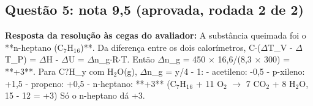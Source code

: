 \documentclass{article}%
\begin{document}
\subsection*{Questão 5: nota 9,5 (aprovada, rodada 2 de 2)}%
\textbf{Resposta da resolução às cegas do avaliador:} A substância queimada foi o **n{-}heptano (C$_{7}$H$_{1}$$_{6}$)**.\newline%
\newline%
Da diferença entre os dois calorímetros, C$\cdot$($\Delta$T\_V - $\Delta$T\_P) = $\Delta$H - $\Delta$U = $\Delta$n\_g$\cdot$R$\cdot$T. Então $\Delta$n\_g = 450 $\times$ 16,6/(8,3 $\times$ 300) = **+3**.\newline%
\newline%
Para C?H\_y com H$_{2}$O(g), $\Delta$n\_g = y/4 - 1:\newline%
{-} acetileno: -0,5\newline%
{-} p{-}xileno: +1,5\newline%
{-} propeno: +0,5\newline%
{-} n{-}heptano: **+3** (C$_{7}$H$_{1}$$_{6}$ + 11 O$_{2}$ $\to$ 7 CO$_{2}$ + 8 H$_{2}$O, 15 - 12 = +3)\newline%
\newline%
Só o n{-}heptano dá +3.\par %
\end{document}
